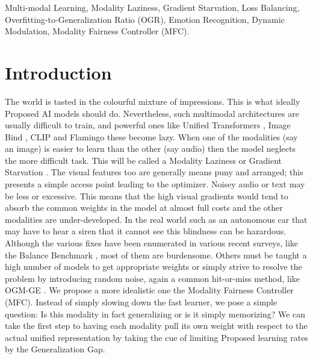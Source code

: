 \documentclass{ieeeaccess}
\begin{document}
	
	\begin{keywords}
Multi-modal Learning, Modality Laziness, Gradient Starvation, Loss Balancing, Overfitting-to-Generalization Ratio (OGR), Emotion Recognition, Dynamic Modulation, Modality Fairness Controller (MFC).	
	\end{keywords}
	
	\titlepgskip=-15pt
	
	\maketitle
    
\section{Introduction}
The world is tasted in the colourful mixture of impressions. This is what ideally Proposed AI models should do. Nevertheless, such multimodal architectures are usually difficult to train, and powerful ones like Unified Transformers \cite{zhang2023meta}, Image Bind \cite{girdhar2023imagebind}, CLIP \cite{radford2021learning} and Flamingo \cite{alayrac2022flamingo} these become lazy. When one of the modalities (say an image) is easier to learn than the other (say audio) then the model neglects the more difficult task. This will be called a Modality Laziness or Gradient Starvation \cite{pezeshki2021gradient}. The visual features too are generally means puny and arranged; this presents a simple access point leading to the optimizer. Noisey audio or text may be less or excessive. This means that the high visual gradients would tend to absorb the common weights in the model at almost full costs and the other modalities are under-developed. In the real world such as an autonomous car that may have to hear a siren that it cannot see this blindness can be hazardous. Although the various fixes have been enumerated in various recent surveys, like the Balance Benchmark \cite{xu2025balancebenchmark}, most of them are burdensome. Others must be taught a high number of models to get appropriate weights or simply strive to resolve the problem by introducing random noise, again a common hit-or-miss method, like OGM-GE \cite{peng2022balanced}. We propose a more idealistic one the Modality Fairness Controller (MFC). Instead of simply slowing down the fast learner, we pose a simple question: Is this modality in fact generalizing or is it simply memorizing? We can take the first step to having each modality pull its own weight with respect to the actual unified representation by taking the cue of limiting Proposed learning rates by the Generalization Gap.
\end{document}
